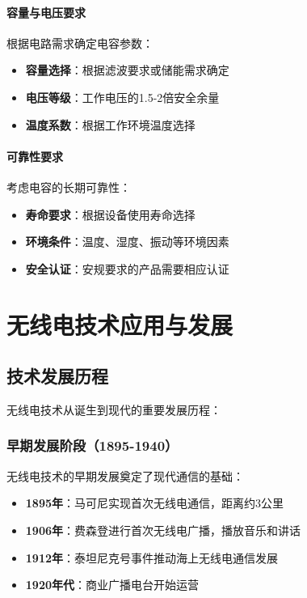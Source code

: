 \documentclass[12pt,UTF8]{ctexbook}
\begin{document}
\subsection{容量与电压要求}

根据电路需求确定电容参数：
\begin{itemize}[leftmargin=3.5em]
    \item \textbf{容量选择}：根据滤波要求或储能需求确定
    \item \textbf{电压等级}：工作电压的1.5-2倍安全余量
    \item \textbf{温度系数}：根据工作环境温度选择
\end{itemize}

\subsection{可靠性要求}

考虑电容的长期可靠性：
\begin{itemize}[leftmargin=3.5em]
    \item \textbf{寿命要求}：根据设备使用寿命选择
    \item \textbf{环境条件}：温度、湿度、振动等环境因素
    \item \textbf{安全认证}：安规要求的产品需要相应认证
\end{itemize}

\part{无线电技术应用与发展}

\chapter{技术发展历程}

无线电技术从诞生到现代的重要发展历程：

\section{早期发展阶段（1895-1940）}

无线电技术的早期发展奠定了现代通信的基础：

\begin{itemize}[leftmargin=3.5em]
    \item \textbf{1895年}：马可尼实现首次无线电通信，距离约3公里
    \item \textbf{1906年}：费森登进行首次无线电广播，播放音乐和讲话
    \item \textbf{1912年}：泰坦尼克号事件推动海上无线电通信发展
    \item \textbf{1920年代}：商业广播电台开始运营
\end{itemize}
\end{document}
